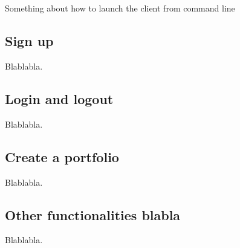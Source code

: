 \chapter{}

Something about how to launch the client from command line

\section{Sign up}
Blablabla.

\section{Login and logout}
Blablabla.

\section{Create a portfolio}
Blablabla.

\section{Other functionalities blabla}
Blablabla.

